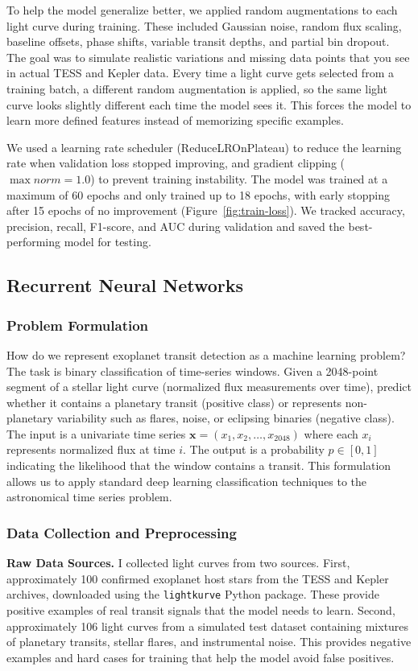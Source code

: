 \documentclass[letterpaper]{article} %
\begin{document}
To help the model generalize better, we applied random augmentations to each light curve during training. These included Gaussian noise, random flux scaling, baseline offsets, phase shifts, variable transit depths, and partial bin dropout. The goal was to simulate realistic variations and missing data points that you see in actual TESS and Kepler data. Every time a light curve gets selected from a training batch, a different random augmentation is applied, so the same light curve looks slightly different each time the model sees it. This forces the model to learn more defined features instead of memorizing specific examples.

We used a learning rate scheduler (ReduceLROnPlateau) to reduce the learning rate when validation loss stopped improving, and gradient clipping ($\max norm=1.0$) to prevent training instability. The model was trained at a maximum of 60 epochs and only trained up to 18 epochs, with early stopping after 15 epochs of no improvement (Figure~\ref{fig:train-loss}). We tracked accuracy, precision, recall, F1-score, and AUC during validation and saved the best-performing model for testing.

\subsection{Recurrent Neural Networks}
\subsubsection{Problem Formulation}
How do we represent exoplanet transit detection as a machine learning problem? The task is binary classification of time-series windows. Given a 2048-point segment of a stellar light curve (normalized flux measurements over time), predict whether it contains a planetary transit (positive class) or represents non-planetary variability such as flares, noise, or eclipsing binaries (negative class). The input is a univariate time series $\mathbf{x} = (x_1, x_2, \ldots, x_{2048})$ where each $x_i$ represents normalized flux at time $i$. The output is a probability $p \in [0,1]$ indicating the likelihood that the window contains a transit. This formulation allows us to apply standard deep learning classification techniques to the astronomical time series problem.

\subsubsection{Data Collection and Preprocessing}
\textbf{Raw Data Sources.} I collected light curves from two sources. First, approximately 100 confirmed exoplanet host stars from the TESS and Kepler archives, downloaded using the \texttt{lightkurve} Python package. These provide positive examples of real transit signals that the model needs to learn. Second, approximately 106 light curves from a simulated test dataset containing mixtures of planetary transits, stellar flares, and instrumental noise. This provides negative examples and hard cases for training that help the model avoid false positives.
\end{document}
